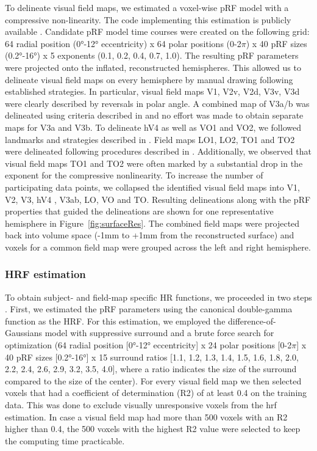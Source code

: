 To delineate visual field maps, we estimated a voxel-wise pRF model with a compressive non-linearity. The code implementing this estimation is publicly available \parencite{pyprf_motion}. Candidate pRF model time courses were created on the following grid: 64 radial position (0°-12° eccentricity) x 64 polar positions (0-2$\pi$) x 40 pRF sizes (0.2°-16°) x 5 exponents (0.1, 0.2, 0.4, 0.7, 1.0). The resulting pRF parameters were projected onto the inflated, reconstructed hemispheres. This allowed us to delineate visual field maps on every hemisphere by manual drawing following established strategies. In particular, visual field maps V1, V2v, V2d, V3v, V3d were clearly described by reversals in polar angle. A combined map of V3a/b was delineated using criteria described in \cite{Wandell2005, Larsson2006} and no effort was made to obtain separate maps for V3a and V3b. To delineate hV4 as well as VO1 and VO2, we followed landmarks and strategies described in \cite{Winawer2017}. Field maps LO1, LO2, TO1 and TO2 were delineated following procedures described in \cite{Amano2009}. Additionally, we observed that visual field maps TO1 and TO2 were often marked by a substantial drop in the exponent for the compressive nonlinearity. To increase the number of participating data points, we collapsed the identified visual field maps into V1, V2, V3, hV4 \parencite{Winawer2010}, V3ab, LO, VO and TO. Resulting delineations along with the pRF properties that guided the delineations are shown for one representative hemisphere in Figure~\ref{fig:surfaceRes}. The combined field maps were projected back into volume space (-1mm to +1mm from the reconstructed surface) and voxels for a common field map were grouped across the left and right hemisphere.

\subsubsection{HRF estimation}
To obtain subject- and field-map specific HR functions, we proceeded in two steps \parencite{Harvey2011, Harvey2015, Harvey2016}. First, we estimated the pRF parameters using the canonical double-gamma function \parencite{Friston1998} as the HRF. For this estimation, we employed the difference-of-Gaussians model with suppressive surround and a brute force search for optimization (64 radial position [0°-12° eccentricity] x 24 polar positions [0-2$\pi$] x 40 pRF sizes [0.2°-16°] x 15 surround ratios [1.1, 1.2, 1.3, 1.4, 1.5, 1.6, 1.8, 2.0, 2.2, 2.4, 2.6, 2.9, 3.2, 3.5, 4.0], where a ratio indicates the size of the surround compared to the size of the center). For every visual field map we then selected voxels that had a coefficient of determination (R2) of at least 0.4 on the training data. This was done to exclude visually unresponsive voxels from the hrf estimation. In case a visual field map had more than 500 voxels with an R2 higher than 0.4, the 500 voxels with the highest R2 value were selected to keep the computing time practicable.

